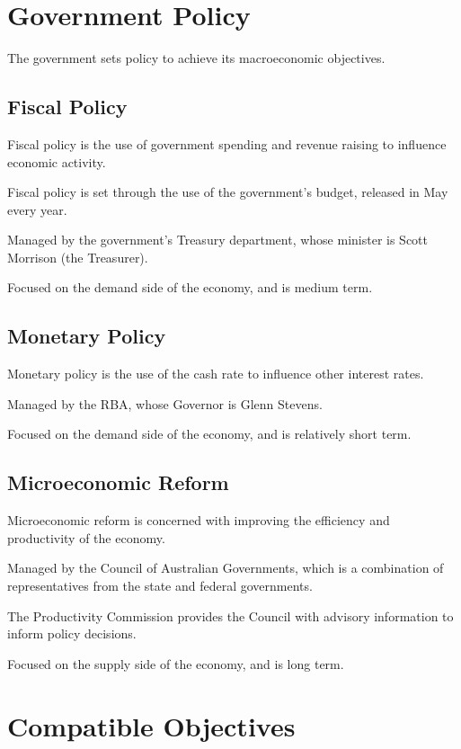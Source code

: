 \documentclass[a4paper,11pt]{report}
\begin{document}
\section{Government Policy}

The government sets policy to achieve its macroeconomic objectives.

\subsection{Fiscal Policy}

Fiscal policy is the use of government spending and revenue raising to influence
economic activity.

Fiscal policy is set through the use of the government's budget, released in May
every year.

Managed by the government's Treasury department, whose minister is Scott
Morrison (the Treasurer).

Focused on the demand side of the economy, and is medium term.

\subsection{Monetary Policy}

Monetary policy is the use of the cash rate to influence other interest rates.

Managed by the RBA, whose Governor is Glenn Stevens.

Focused on the demand side of the economy, and is relatively short term.

\subsection{Microeconomic Reform}

Microeconomic reform is concerned with improving the efficiency and productivity
of the economy.

Managed by the Council of Australian Governments, which is a combination of
representatives from the state and federal governments.

The Productivity Commission provides the Council with advisory information to
inform policy decisions.

Focused on the supply side of the economy, and is long term.


\section{Compatible Objectives}
\end{document}
